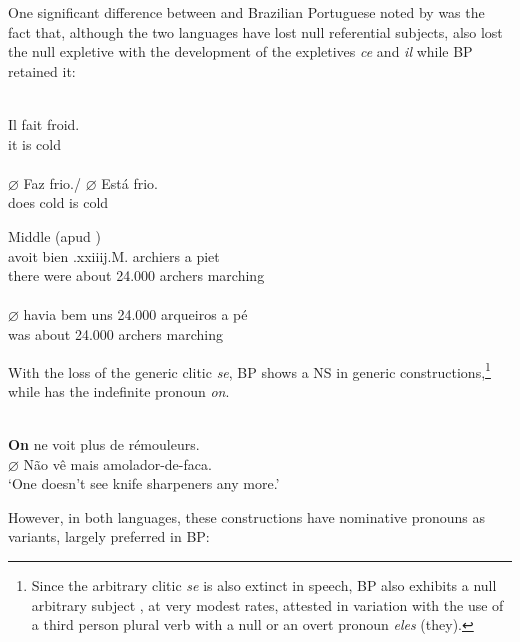 \documentclass[output=paper]{langsci/langscibook}
\begin{document}
One significant difference between  and Brazilian Portuguese noted
by \citet{Duarte1995} was the fact that, although the two  languages
have lost null referential subjects,  also lost the null expletive
with the development of the expletives \emph{ce}  and \emph{il} while
\gls{BP} retained it:

\ea%
    \label{ex:26.11}
    \ea {}\\
    \gll    Il fait froid.\\
            it is  cold\\
    \ex {}\\
    \gll    \textbf{$\varnothing$}\tss{\Expl} Faz frio./ $\varnothing$\tss{\Expl} Está frio.\\
            {} does cold {} is cold\\
    \z
\z

\ea%
    \label{ex:26.12}
    \ea Middle  (apud \citealt[151]{Roberts1993})\\
     avoit bien .xxiiij.M.   archiers {a piet}\\
            there were about 24.000 archers marching\\
    \ex {}\\
    \gll    $\varnothing$\tss{\Expl} havia {bem uns} 24.000    arqueiros {a pé}\\
            {}  was about 24.000 archers marching\\
    \z
\z

With the loss of the generic clitic \emph{se}, BP shows a NS in
generic constructions,\footnote{Since the arbitrary clitic \emph{se} is also
    extinct in speech, \gls{BP} also exhibits a null arbitrary subject
    \parencite{Rodrigues2004}, at very modest rates, attested in variation
with the use of a third person plural verb with a null or an overt pronoun
\emph{eles} (they).} while  has the indefinite pronoun \emph{on}.

\ea%
    \label{ex:26.13}
    \ea {}\\
        \textbf{On} ne voit plus de rémouleurs.
    \ex {}\\
        $\varnothing$ Não vê mais amolador-de-faca.\\
        ‘One doesn’t see knife sharpeners any more.’
    \z
\z

However, in both languages, these constructions have nominative pronouns as
variants, largely preferred in \gls{BP}:
\end{document}
